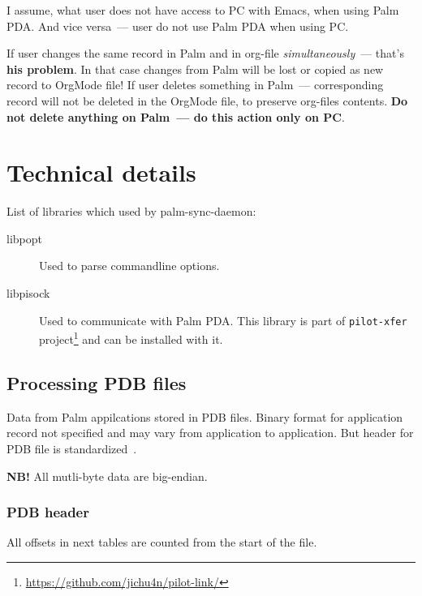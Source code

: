 \documentclass[a4paper,12pt,oneside]{scrartcl}
\begin{document}
I assume, what user does not have access to PC with Emacs, when using Palm
PDA. And vice versa~--- user do not use Palm PDA when using PC.

If user changes the same record in Palm and in org-file
\textit{simultaneously}~--- that's \textbf{his problem}. In that case changes
from Palm will be lost or copied as new record to OrgMode file! If user deletes
something in Palm~--- corresponding record will not be deleted in the OrgMode
file, to preserve org-files contents. \textbf{Do not delete anything on Palm~---
  do this action only on PC}.

\section{Technical details}
\label{sec:technical-details}

List of libraries which used by palm-sync-daemon:

\begin{description}
\item[libpopt] Used to parse commandline options.
\item[libpisock] Used to communicate with Palm PDA. This library is part of
  \texttt{pilot-xfer}
  project\footnote{\url{https://github.com/jichu4n/pilot-link/}} and can be
  installed with it.
\end{description}

\subsection{Processing PDB files}
\label{sec:parsing-pdb-files}

Data from Palm appilcations stored in PDB files. Binary format for application
record not specified and may vary from application to application. But header
for PDB file is standardized~\cite{PalmFileFormatSpec}.

\textbf{NB!} All mutli-byte data are big-endian.

\subsubsection{PDB header}
\label{sec:pdb-header}

All offsets in next tables are counted from the start of the file.
\end{document}
